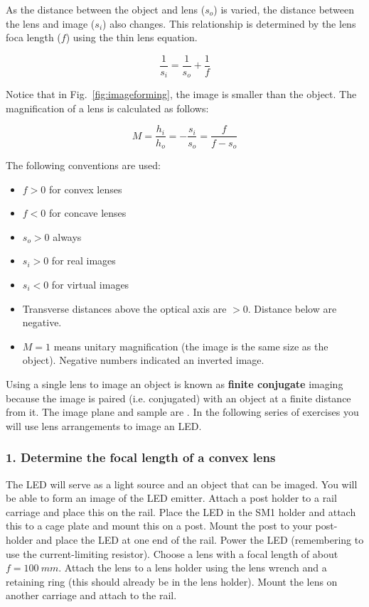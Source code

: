 \documentclass[a4paper]{report}
\begin{document}
As the distance between the object and lens ($s_o$) is varied, the distance between the lens and image ($s_i$) also changes. This relationship is determined by the lens foca length ($f$) using the thin lens equation.

\begin{equation}
\frac{1}{s_i}=\frac{1}{s_o}+\frac{1}{f}
\label{eq:thinlens}
\end{equation}

Notice that in Fig.~\ref{fig:imageforming}, the image is smaller than the object. The magnification of a lens is calculated as follows:

\begin{equation}
M = \frac{h_i}{h_o} = -\frac{s_i}{s_o} = \frac{f}{f-s_o}
\label{eq:mag}
\end{equation}

The following conventions are used:
\begin{itemize}
\item $f>0$ for convex lenses
\item $f<0$ for concave lenses
\item $s_o>0$ always
\item $s_i>0$ for real images
\item $s_i<0$ for virtual images
\item Transverse distances above the optical axis are $>0$. Distance
  below are negative. 
\item $M=1$ means unitary magnification (the image is the same size as
  the object). Negative numbers indicated an inverted image.
\end{itemize}

Using a single lens to image an object is known as \textbf{finite conjugate} imaging because the image is paired (i.e. conjugated) with an object at a finite distance from it.
The image plane and sample are .
In the following series of exercises you will use lens arrangements to image an LED.

\subsubsection{1. Determine the focal length of a convex lens }
The LED will serve as a light source and an object that can be imaged. 
You will be able to form an image of the LED emitter.
Attach a post holder to a rail carriage and place this on the rail. 
Place the LED in the SM1 holder and attach this to a cage plate and mount this on a post. 
Mount the post to your post-holder and place the LED at one end of the rail.
Power the LED (remembering to use the current-limiting resistor). 
Choose a lens with a focal length of about $f=100~mm$. 
Attach the lens to a lens holder using the lens wrench and a retaining ring (this should already be in the lens holder).
Mount the lens on another carriage and attach to the rail. 
\end{document}
